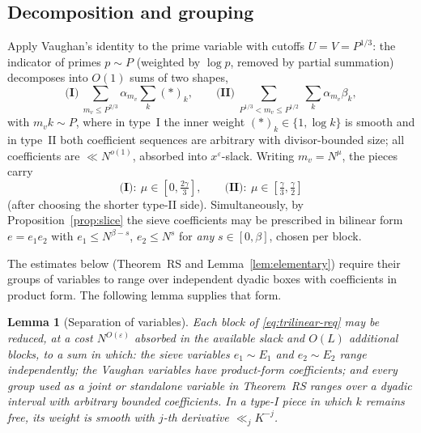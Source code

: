 \documentclass[11pt]{article}
\newtheorem{lemma}[theorem]{Lemma}
\theoremstyle{remark}
\newcommand{\N}{N}
\begin{document}
\subsection{Decomposition and grouping}\label{sec:decomp}

Apply Vaughan's identity \cite{Vaughan} to the prime variable with cutoffs
$U=V=P^{1/3}$: the indicator of primes $p\sim P$ (weighted by $\log p$, removed by
partial summation) decomposes into $O(1)$ sums of two shapes,
\[
\textbf{(I)}\ \sum_{m_v\le P^{2/3}}\alpha_{m_v}\sum_{k}(\ast)_k,\qquad
\textbf{(II)}\ \sum_{P^{1/3}<m_v\le P^{1/2}}\ \sum_{k}\alpha_{m_v}\beta_k ,
\]
with $m_vk\sim P$, where in type~I the inner weight $(\ast)_k\in\{1,\log k\}$ is
smooth and in type~II both coefficient sequences are arbitrary with divisor-bounded
size; all coefficients are $\ll \N^{o(1)}$, absorbed into $x^{\varepsilon}$-slack.
Writing $m_v=\N^{\mu}$, the pieces carry
\[
\textbf{(I)}:\ \mu\in[0,\tfrac{2\gamma}{3}],\qquad
\textbf{(II)}:\ \mu\in[\tfrac{\gamma}{3},\tfrac{\gamma}{2}]
\]
(after choosing the shorter type-II side). Simultaneously, by
Proposition~\ref{prop:slice} the sieve coefficients may be prescribed in bilinear
form $e=e_1e_2$ with $e_1\le \N^{\beta-s}$, $e_2\le \N^{s}$ for \emph{any}
$s\in[0,\beta]$, chosen per block.

The estimates below (Theorem~RS and Lemma~\ref{lem:elementary}) require their groups
of variables to range over independent dyadic boxes with coefficients in product
form. The following lemma supplies that form.

\begin{lemma}[Separation of variables]\label{lem:separation}
Each block of \eqref{eq:trilinear-req} may be reduced, at a cost
$\N^{O(\varepsilon)}$ absorbed in the available slack and $O(L)$ additional
blocks, to a sum in which:
the sieve variables $e_1\sim E_1$ and $e_2\sim E_2$ range independently;
the Vaughan variables have product-form coefficients; and every group used as
a joint or standalone variable in Theorem~RS ranges over a dyadic interval
with arbitrary bounded coefficients. In a type-I piece in which $k$ remains
free, its weight is smooth with $j$-th derivative $\ll_j K^{-j}$.
\end{lemma}
\end{document}
